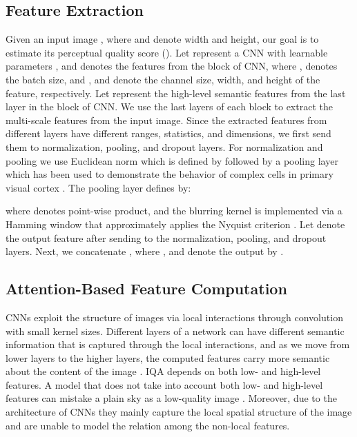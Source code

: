 \documentclass[10pt,twocolumn,letterpaper]{article}
\begin{document}
\subsection{Feature Extraction}\label{S3.1}
Given an input image , where  and  denote width and height, our goal is to estimate its perceptual quality score (). 
Let  represent a CNN  with learnable parameters , and   denotes the features from the  block of CNN, where  ,   denotes the batch size, and , and  denote the  channel size, width, and height of the  feature, respectively.
Let  represent  the high-level semantic features from the last layer in the  block of CNN.
We use the last layers of each block to extract the multi-scale features from the input image.
Since the extracted features from different layers have different ranges, statistics, and dimensions,   we first send them to normalization, pooling, and dropout layers.
For normalization and pooling we use Euclidean norm which is defined by  followed by a  pooling layer   \cite{henaff2015geodesics,ding2020image} which has been used to demonstrate the behavior of complex cells in primary 
visual cortex \cite{bruna2013invariant,vintch2015convolutional}.
The  pooling layer defines by:

where  denotes point-wise product, and the blurring kernel
 is implemented via a Hamming window that approximately applies the Nyquist criterion \cite{ding2020image}.
Let  denote the output feature after sending   to the normalization, pooling, and dropout layers.
Next, we  concatenate , where , and  denote  the output by .


\subsection{Attention-Based Feature Computation}
\label{S3.2}
CNNs exploit  the structure of images via local interactions through convolution with small kernel sizes. 
Different layers of a network can have different semantic information that is   captured through the local interactions,  and as we move from lower layers to the higher layers, the computed features carry more semantic about the content of the image \cite{zeiler2014visualizing}.
IQA depends on both low- and high-level features. 
A model that does not take into account both low- and high-level features  can  mistake a plain sky as a low-quality image \cite{li2018has}.
Moreover, due to the architecture of CNNs   they mainly capture the local spatial structure of the image and are unable to  model the relation  among  the  non-local features. 
\end{document}
